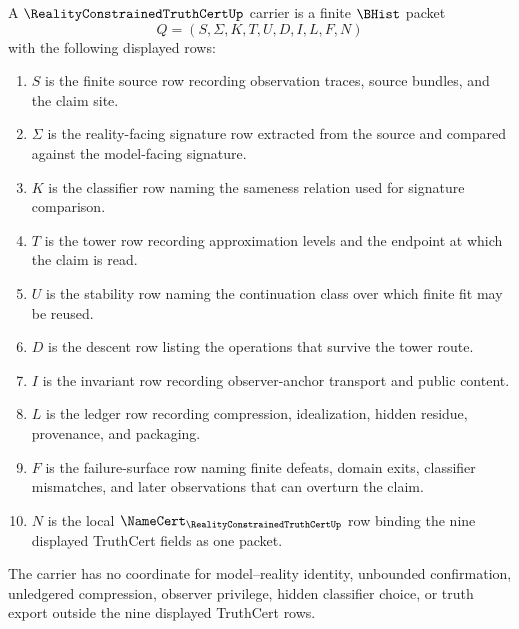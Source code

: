 \begin{definition}
\label{def:reality-constrained-truth-cert-carrier}
A $\RealityConstrainedTruthCertUp$ carrier is a finite $\BHist$ packet
$$
Q=(S,\Sigma,K,T,U,D,I,L,F,N)
$$
with the following displayed rows:
\begin{enumerate}
\item $S$ is the finite source row recording observation traces, source bundles, and the claim site.
\item $\Sigma$ is the reality-facing signature row extracted from the source and compared against the model-facing signature.
\item $K$ is the classifier row naming the sameness relation used for signature comparison.
\item $T$ is the tower row recording approximation levels and the endpoint at which the claim is read.
\item $U$ is the stability row naming the continuation class over which finite fit may be reused.
\item $D$ is the descent row listing the operations that survive the tower route.
\item $I$ is the invariant row recording observer-anchor transport and public content.
\item $L$ is the ledger row recording compression, idealization, hidden residue, provenance, and packaging.
\item $F$ is the failure-surface row naming finite defeats, domain exits, classifier mismatches, and later observations that can overturn the claim.
\item $N$ is the local $\NameCert_{\RealityConstrainedTruthCertUp}$ row binding the nine displayed TruthCert fields as one packet.
\end{enumerate}
The carrier has no coordinate for model--reality identity, unbounded confirmation, unledgered compression, observer privilege, hidden classifier choice, or truth export outside the nine displayed TruthCert rows.
\end{definition}

